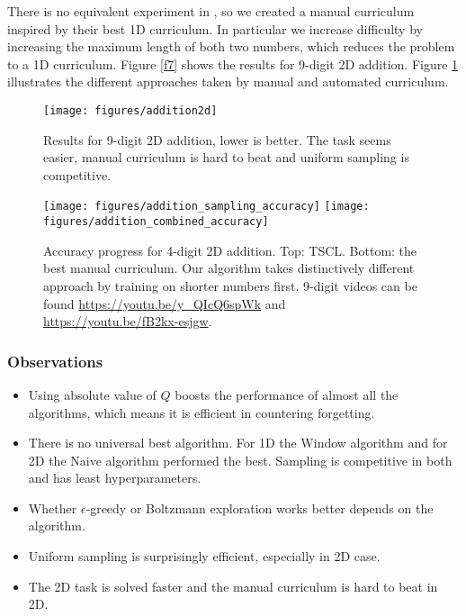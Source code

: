 \documentclass{article}
\begin{document}
There is no equivalent experiment in \citep{Zaremba2014}, so we created a manual curriculum inspired by their best 1D curriculum. In particular we increase difficulty by increasing the maximum length of both two numbers, which reduces the problem to a 1D curriculum. Figure \ref{f7} shows the results for 9-digit 2D addition. Figure \ref{f8} illustrates the different approaches taken by manual and automated curriculum.

\begin{figure}[h]
\begin{minipage}[b]{65mm}
  \texttt{[image: figures/addition2d]}
\caption{Results for 9-digit 2D addition, lower is better. The task seems easier, manual curriculum is hard to beat and uniform sampling is competitive.}
\label{f7}
\end{minipage}
\hfill
\begin{minipage}[b]{65mm}
  \texttt{[image: figures/addition\_sampling\_accuracy]}
  \texttt{[image: figures/addition\_combined\_accuracy]}
\caption{Accuracy progress for 4-digit 2D addition. Top: TSCL. Bottom: the best manual curriculum. Our algorithm takes distinctively different approach by training on shorter numbers first. 9-digit videos can be found \url{https://youtu.be/y_QIcQ6spWk} and \url{https://youtu.be/fB2kx-esjgw}.}
\label{f8}
\end{minipage}
\end{figure}

\subsubsection{Observations}

\begin{itemize}
\item Using absolute value of $Q$ boosts the performance of almost all the algorithms, which means it is efficient in countering forgetting.

\item There is no universal best algorithm. For 1D the Window algorithm and for 2D the Naive algorithm performed the best. Sampling is competitive in both and has least hyperparameters.

\item Whether $\epsilon$-greedy or Boltzmann exploration works better depends on the algorithm.

\item Uniform sampling is surprisingly efficient, especially in 2D case.

\item The 2D task is solved faster and the manual curriculum is hard to beat in 2D.
\end{itemize}
\end{document}
